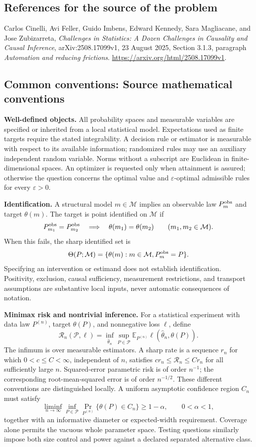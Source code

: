 \documentclass[11pt,a4paper]{article}
\newcommand{\E}{\mathbb E}
\begin{document}
\subsection*{References for the source of the problem}
Carlos Cinelli, Avi Feller, Guido Imbens, Edward Kennedy, Sara Magliacane, and Jose Zubizarreta, \emph{Challenges in Statistics: A Dozen Challenges in Causality and Causal Inference}, arXiv:2508.17099v1, 23 August 2025, Section 3.1.3, paragraph \emph{Automation and reducing frictions}. \url{https://arxiv.org/html/2508.17099v1}.

\subsection*{Common conventions: Source mathematical conventions}

\textbf{Well-defined objects.}
All probability spaces and measurable variables are specified or inherited
from a local statistical model. Expectations used as finite targets require
the stated integrability. A decision rule or estimator is measurable with
respect to its available information; randomized rules may use an auxiliary
independent random variable. Norms without a subscript are Euclidean in
finite-dimensional spaces. An optimizer is requested only when attainment
is assured; otherwise the question concerns the optimal value and
$\varepsilon$-optimal admissible rules for every $\varepsilon>0$.

\textbf{Identification.}
A structural model $m\in\mathcal M$ implies an observable law
$P_m^{\rm obs}$ and target $\theta(m)$. The target is point identified on
$\mathcal M$ if
\[
 P_{m_1}^{\rm obs}=P_{m_2}^{\rm obs}
 \quad\Longrightarrow\quad\theta(m_1)=\theta(m_2)
 \qquad(m_1,m_2\in\mathcal M).
\]
When this fails, the sharp identified set is
\[
 \Theta(P;\mathcal M)=\{\theta(m):m\in\mathcal M,
                                  P_m^{\rm obs}=P\}.
\]
Specifying an intervention or estimand does not establish identification.
Positivity, exclusion, causal sufficiency, measurement restrictions, and
transport assumptions are substantive local inputs, never automatic
consequences of notation.

\textbf{Minimax risk and nontrivial inference.}
For a statistical experiment with data law $P^{(n)}$, target $\theta(P)$,
and nonnegative loss $\ell$, define
\[
 \mathcal R_n(\mathcal P,\ell)
   =\inf_{\widehat\theta_n}\sup_{P\in\mathcal P}
      \E_{P^{(n)}}\ell(\widehat\theta_n,\theta(P)).
\]
The infimum is over measurable estimators. A sharp rate is a sequence
$r_n$ for which $0<c\leq C<\infty$, independent of $n$, satisfies
$c r_n\leq\mathcal R_n\leq C r_n$ for all sufficiently large $n$.
Squared-error parametric risk is of order $n^{-1}$; the corresponding
root-mean-squared error is of order $n^{-1/2}$. These different conventions
are distinguished locally. A uniform asymptotic confidence region $C_n$
must satisfy
\[
 \liminf_{n\to\infty}\inf_{P\in\mathcal P}
     \Pr_{P^{(n)}}\{\theta(P)\in C_n\}\geq 1-\alpha,
 \qquad 0<\alpha<1,
\]
together with an informative diameter or expected-width requirement.
Coverage alone permits the vacuous whole parameter space. Testing questions
similarly impose both size control and power against a declared separated
alternative class.
\end{document}

